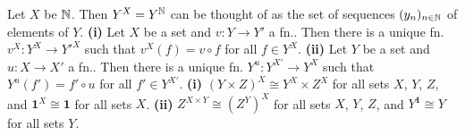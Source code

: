  Let $X$ be $\operatorname{\mathbb{N}}$. Then $Y^X = Y^{\operatorname{\mathbb{N}}}$ can be thought of as the set of sequences $(y_n)_{n \in \operatorname{\mathbb{N}}}$ of elements of $Y$.
 \textbf{(i)} Let $X$ be a set and $v \colon Y \to Y'$ a fn.. Then there is a unique fn. $v^X \colon Y^X \to Y'^X$ such that $v^X(f) = v \circ f$ for all $f \in Y^X$. \textbf{(ii)} Let $Y$ be a set and $u \colon X \to X'$ a fn.. Then there is a unique fn. $Y^u \colon Y^{X'} \to Y^X$ such that $Y^u(f') = f' \circ u$ for all $f' \in Y^{X'}$.
 \textbf{(i)} $(Y \times Z)^X \cong Y^X \times Z^X$ for all sets $X$, $Y$, $Z$, and $\mathbf{1}^X \cong \mathbf{1}$ for all sets $X$. \textbf{(ii)} $Z^{X \times Y} \cong (Z^Y)^X$ for all sets $X$, $Y$, $Z$, and $Y^{\mathbf{1}} \cong Y$ for all sets $Y$.
